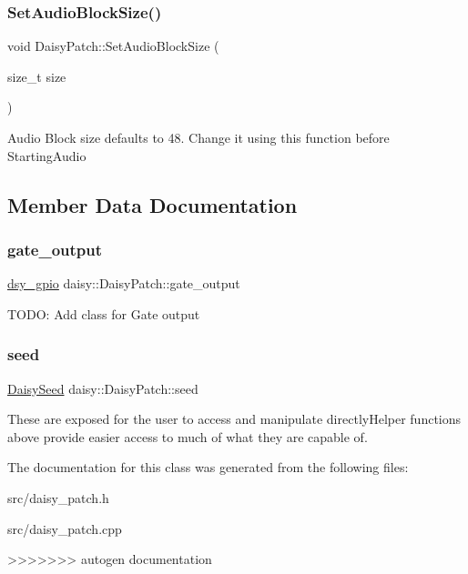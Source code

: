 \subsubsection{\texorpdfstring{Set\+Audio\+Block\+Size()}{SetAudioBlockSize()}}
{\footnotesize\ttfamily void Daisy\+Patch\+::\+Set\+Audio\+Block\+Size (\begin{DoxyParamCaption}\item[{size\+\_\+t}]{size }\end{DoxyParamCaption})}

Audio Block size defaults to 48. Change it using this function before Starting\+Audio 

\subsection{Member Data Documentation}
\mbox{\label{classdaisy_1_1_daisy_patch_a91a7d7e5aae230d58794b63c78f2cfda}} 
\subsubsection{\texorpdfstring{gate\+\_\+output}{gate\_output}}
{\footnotesize\ttfamily \hyperlink{structdsy__gpio}{dsy\+\_\+gpio} daisy\+::\+Daisy\+Patch\+::gate\+\_\+output}

T\+O\+DO\+: Add class for Gate output \mbox{\label{classdaisy_1_1_daisy_patch_a4705ca24e5ebc4d8add7d83232162fd7}} 
\subsubsection{\texorpdfstring{seed}{seed}}
{\footnotesize\ttfamily \hyperlink{classdaisy_1_1_daisy_seed}{Daisy\+Seed} daisy\+::\+Daisy\+Patch\+::seed}

These are exposed for the user to access and manipulate directly\+Helper functions above provide easier access to much of what they are capable of. 

The documentation for this class was generated from the following files\+:\begin{DoxyCompactItemize}
\item 
src/daisy\+\_\+patch.\+h\item 
src/daisy\+\_\+patch.\+cpp\end{DoxyCompactItemize}
>>>>>>> autogen documentation
